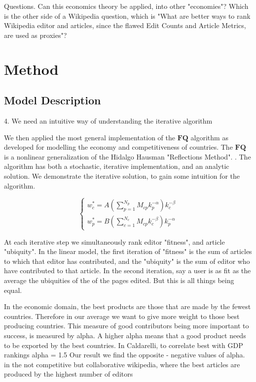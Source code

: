 \documentclass{acm_proc_article-sp}
\begin{document}
Questions. Can this economics theory be applied, into other "economies"? Which is the other side of a Wikipedia question, which is "What are better ways to rank Wikipedia editor and articles, since the flawed Edit Counts and Article Metrics, are used as proxies"?



 

\section{Method}

\subsection{Model Description}
4. We need an intuitive way of understanding the iterative algorithm

We then applied the most general implementation of the $\mathbf{FQ}$ algorithm as developed for modelling the economy and competitiveness of countries. The $\mathbf{FQ}$ is a nonlinear generalization of the Hidalgo Hausman "Reflections Method". \cite{Caldarelli}. The algorithm has both a stochastic, iterative implementation, and an analytic solution. We demonstrate the iterative solution, to gain some intuition for the algorithm.

\begin{equation}
\begin{cases}
 w^*_c = A(\sum^{N_p}_{p=1} M_{cp}k_p^{-\alpha})k_c^{-\beta} \\
w^*_p = B(\sum^{N_c}_{c=1} M_{cp}k_c^{-\beta})k_p^{-\alpha}
\end{cases}
\end{equation}

At each iterative step we simultaneously rank editor "fitness", and article "ubiquity". In the linear model, the first iteration of "fitness" is the sum of articles to which that editor has contributed, and the "ubiquity" is the sum of editor who have contributed to that article. In the second iteration, say a user is as fit as the average the ubiquities of the of the pages edited. But this is all things being equal.

In the economic domain, the best products are those that are made by the fewest countries. Therefore in our average we want to give more weight to those best producing countries. This measure of good contributors being more important to success, is measured by alpha. A higher alpha means that a good product needs to be exported by the best countries. In Caldarelli, to correlate best with GDP rankings alpha = 1.5 Our result we find the  opposite - negative values of alpha. in the not competitive but collaborative wikipedia, where the best articles are produced by the highest number of editors
\end{document}
